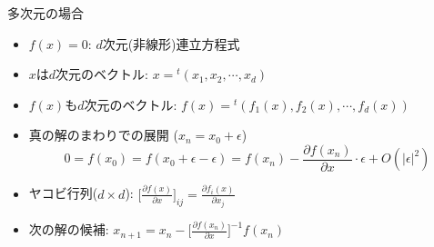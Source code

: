 \begin{frame}[t,fragile]{多次元の場合}
  \begin{itemize}
    \setlength{\itemsep}{1em}
  \item $f(x)=0$: $d$次元(非線形)連立方程式
  \item $x$は$d$次元のベクトル: $x = {}^t(x_1,x_2,\cdots,x_d)$
  \item $f(x)$も$d$次元のベクトル: $f(x) = {}^t(f_1(x), f_2(x),\cdots,f_d(x))$
  \item 真の解のまわりでの展開 ($x_n = x_0 + \epsilon$)
    \[
    0 = f(x_0) = f(x_0+\epsilon-\epsilon) = f(x_n) - \frac{\partial f(x_n)}{\partial x} \cdot \epsilon + O(|\epsilon|^2)
    \]
  \item ヤコビ行列($d\times d$): $\displaystyle \Big[\frac{\partial f(x)}{\partial x}\Big]_{ij} = \frac{\partial f_i(x)}{\partial x_j}$
  \item 次の解の候補: $\displaystyle x_{n+1} = x_n - \Big[\frac{\partial f(x_n)}{\partial x}\Big]^{-1} f(x_n)$
  \end{itemize}
\end{frame}

